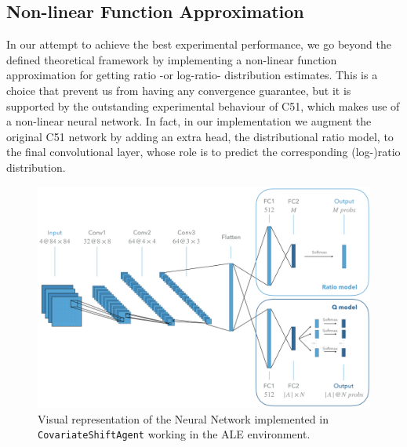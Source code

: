\documentclass[12pt,a4paper,openright,twoside]{article}
\numberwithin{equation}{section}
\theoremstyle{definition}
\theoremstyle{remark}
\theoremstyle{plain}
\begin{document}
\subsection{Non-linear Function Approximation}

In our attempt to achieve the best experimental performance, we go beyond the defined theoretical framework by implementing a non-linear function approximation for getting ratio -or log-ratio- distribution estimates. This is a choice that prevent us from having any convergence guarantee, but it is supported by the outstanding experimental behaviour of C51\cite{DRL}, which makes use of a non-linear neural network. In fact, in our implementation we augment the original C51 network by adding an extra head, the distributional ratio model, to the final convolutional layer, whose role is to predict the corresponding (log-)ratio distribution. 

\begin{figure}[h]
    \centering
    \includegraphics[width=\textwidth]{Model_Network}
    \caption{Visual representation of the Neural Network implemented in \texttt{CovariateShiftAgent} working in the ALE environment.}
    \label{fig:network}
\end{figure}
\end{document}
